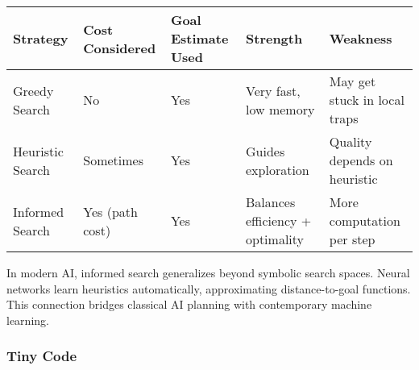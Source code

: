 \documentclass[
  letterpaper,
  DIV=11,
  numbers=noendperiod]{scrreprt}
\begin{document}
\begin{longtable}[]{@{}
  >{\raggedright\arraybackslash}p{}
  >{\raggedright\arraybackslash}p{}
  >{\raggedright\arraybackslash}p{}
  >{\raggedright\arraybackslash}p{}
  >{\raggedright\arraybackslash}p{}@{}}
\toprule\noalign{}
\begin{minipage}[b]{\linewidth}\raggedright
Strategy
\end{minipage} & \begin{minipage}[b]{\linewidth}\raggedright
Cost Considered
\end{minipage} & \begin{minipage}[b]{\linewidth}\raggedright
Goal Estimate Used
\end{minipage} & \begin{minipage}[b]{\linewidth}\raggedright
Strength
\end{minipage} & \begin{minipage}[b]{\linewidth}\raggedright
Weakness
\end{minipage} \\
\midrule\noalign{}
\endhead
\bottomrule\noalign{}
\endlastfoot
Greedy Search & No & Yes & Very fast, low memory & May get stuck in
local traps \\
Heuristic Search & Sometimes & Yes & Guides exploration & Quality
depends on heuristic \\
Informed Search & Yes (path cost) & Yes & Balances efficiency +
optimality & More computation per step \\
\end{longtable}

In modern AI, informed search generalizes beyond symbolic search spaces.
Neural networks learn heuristics automatically, approximating
distance-to-goal functions. This connection bridges classical AI
planning with contemporary machine learning.

\subsubsection{Tiny Code}\label{tiny-code-64}
\end{document}
